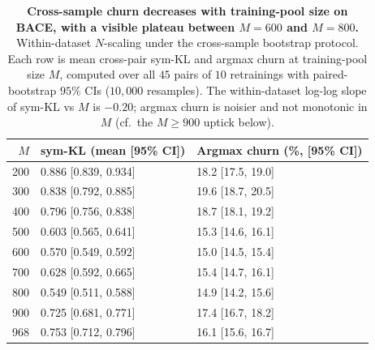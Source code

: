 \begin{table}[h]
  \centering
  \caption{\textbf{\boldmath Cross-sample churn decreases with training-pool size on BACE, with a visible plateau between $M{=}600$ and $M{=}800$.}  Within-dataset $N$-scaling under the cross-sample bootstrap protocol.  Each row is mean cross-pair sym-KL and argmax churn at training-pool size $M$, computed over all $45$ pairs of $10$ retrainings with paired-bootstrap $95\%$ CIs ($10{,}000$ resamples).  The within-dataset log-log slope of sym-KL vs $M$ is $-0.20$; argmax churn is noisier and not monotonic in $M$ (cf.\ the $M{\geq}900$ uptick below).}
  \label{tab:nscaling}
  \small
  \begin{tabular}{rll}
    \toprule
    $M$ & sym-KL (mean [95\% CI]) & Argmax churn (\%, [95\% CI]) \\
    \midrule
    200 & 0.886 [0.839, 0.934] & 18.2 [17.5, 19.0] \\
    300 & 0.838 [0.792, 0.885] & 19.6 [18.7, 20.5] \\
    400 & 0.796 [0.756, 0.838] & 18.7 [18.1, 19.2] \\
    500 & 0.603 [0.565, 0.641] & 15.3 [14.6, 16.1] \\
    600 & 0.570 [0.549, 0.592] & 15.0 [14.5, 15.4] \\
    700 & 0.628 [0.592, 0.665] & 15.4 [14.7, 16.1] \\
    800 & 0.549 [0.511, 0.588] & 14.9 [14.2, 15.6] \\
    900 & 0.725 [0.681, 0.771] & 17.4 [16.7, 18.2] \\
    968 & 0.753 [0.712, 0.796] & 16.1 [15.6, 16.7] \\
    \bottomrule
  \end{tabular}
\end{table}
